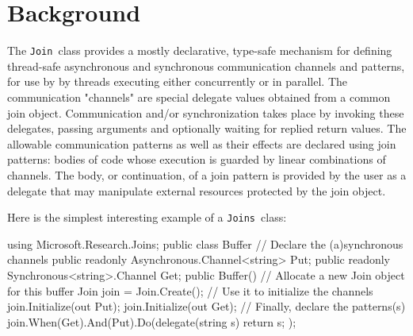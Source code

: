 \documentclass{article}
\newcommand{\joins}{{\texttt{Joins}}}
\newcommand{\cjoin}{{\texttt{Join}}}
\begin{document}
\section{Background}

The \cjoin\ class provides a mostly declarative, type-safe mechanism for
defining thread-safe asynchronous and synchronous
communication channels and patterns, for use by
by threads executing either concurrently or in parallel.
The communication "channels" are special delegate values
obtained from a common join object. Communication and/or
synchronization takes place by invoking these delegates,
passing arguments and optionally waiting for replied
return values.  The allowable communication patterns as
well as their effects are declared using join patterns:
bodies of code whose execution is guarded by linear
combinations of channels. The body, or continuation, of a
join pattern is provided by the user as a delegate that
may manipulate external resources protected by the join
object.


Here is the simplest interesting example of a \joins\ class:

\begin{lstcsharp}
using Microsoft.Research.Joins;
public class Buffer {
  // Declare the (a)synchronous channels
  public readonly Asynchronous.Channel<string> Put;
  public readonly Synchronous<string>.Channel Get;
  public Buffer() {
    // Allocate a new Join object for this buffer
    Join join = Join.Create();
    // Use it to initialize the channels
    join.Initialize(out Put);  
    join.Initialize(out Get);
    // Finally, declare the patterns(s)
    join.When(Get).And(Put).Do(delegate(string s) {
       return s; 
    });
  }
}
\end{lstcsharp}
\end{document}

